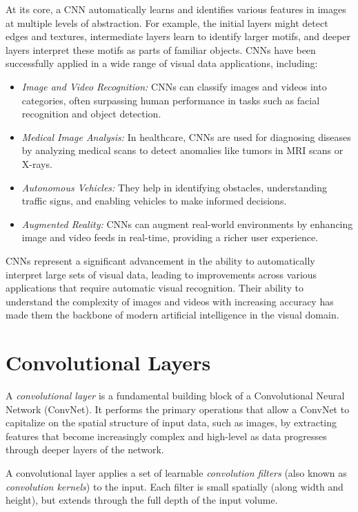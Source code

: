 At its core, a CNN automatically learns and identifies various features in images at multiple levels of abstraction. For example, the initial layers might detect edges and textures, intermediate layers learn to identify larger motifs, and deeper layers interpret these motifs as parts of familiar objects. CNNs have been successfully applied in a wide range of visual data applications, including:

\begin{itemize}
\item \emph{Image and Video Recognition:} CNNs can classify images and videos into categories, often surpassing human performance in tasks such as facial recognition and object detection.
\item \emph{Medical Image Analysis:} In healthcare, CNNs are used for diagnosing diseases by analyzing medical scans to detect anomalies like tumors in MRI scans or X-rays.
\item \emph{Autonomous Vehicles:} They help in identifying obstacles, understanding traffic signs, and enabling vehicles to make informed decisions.
\item \emph{Augmented Reality:} CNNs can augment real-world environments by enhancing image and video feeds in real-time, providing a richer user experience.
\end{itemize}

CNNs represent a significant advancement in the ability to automatically interpret large sets of visual data, leading to improvements across various applications that require automatic visual recognition. Their ability to understand the complexity of images and videos with increasing accuracy has made them the backbone of modern artificial intelligence in the visual domain.

\section{Convolutional Layers}

A \emph{convolutional layer} is a fundamental building block of a Convolutional Neural Network (ConvNet). It performs the primary operations that allow a ConvNet to capitalize on the spatial structure of input data, such as images, by extracting features that become increasingly complex and high-level as data progresses through deeper layers of the network.

A convolutional layer applies a set of learnable \emph{convolution filters} (also known as \emph{convolution kernels}) to the input. Each filter is small spatially (along width and height), but extends through the full depth of the input volume.

